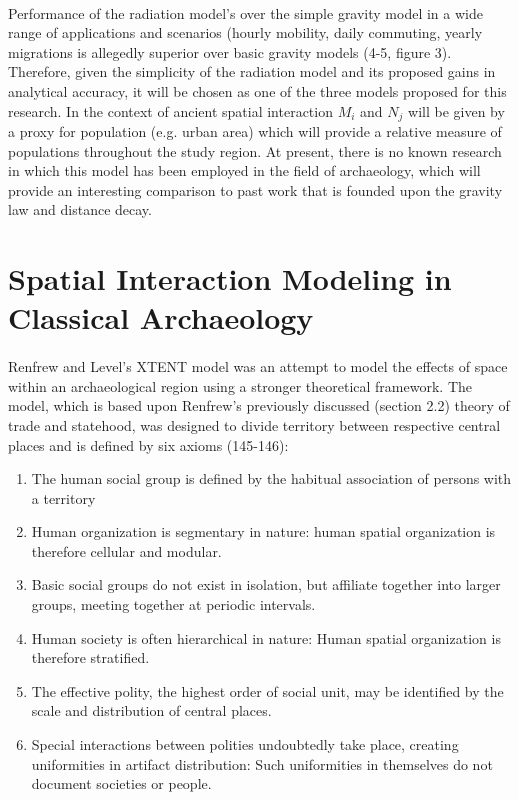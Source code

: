 \documentclass[12pt,a4paper]{thesis}
\begin{document}
\paragraph{}	
Performance of the radiation model's over the simple gravity model in a wide range of applications and scenarios (hourly mobility, daily commuting, yearly migrations is allegedly superior over basic gravity models (4-5, figure 3). Therefore, given the simplicity of the radiation model and its proposed gains in analytical accuracy, it will be chosen as one of the three models proposed for this research. In the context of ancient spatial interaction $M_{i}$ and $N_{j}$ will be given by a proxy for population (e.g. urban area) which will provide a relative measure of populations throughout the study region. At present, there is no known research in which this model has been employed in the field of archaeology, which will provide an interesting comparison to past work that is founded upon the gravity law and distance decay.

\section{Spatial Interaction Modeling in Classical Archaeology}

\paragraph{}	
Renfrew and Level's XTENT model \citeyearpar{RenLev79} was an attempt to model the effects of space within an archaeological region using a stronger theoretical framework. The model, which is based upon Renfrew's previously discussed (section 2.2)  theory of trade and statehood, was designed to divide territory between respective central places and is defined by six  axioms (145-146):

	
\begin{enumerate}
\item The human social group is defined by the habitual association of persons with a territory
\item Human organization is segmentary in nature: human spatial organization is therefore cellular and modular.
\item Basic social groups do not exist in isolation, but affiliate together into larger groups, meeting together at periodic intervals. 
\item Human society is often hierarchical in nature: Human spatial organization is therefore 	stratified.
\item The effective polity, the highest order of social unit, may be identified by the scale and 	distribution of central places.
\item Special interactions between polities undoubtedly take place, creating uniformities in 	artifact distribution: Such uniformities in themselves do not document societies or people.
\end{enumerate}
\end{document}
